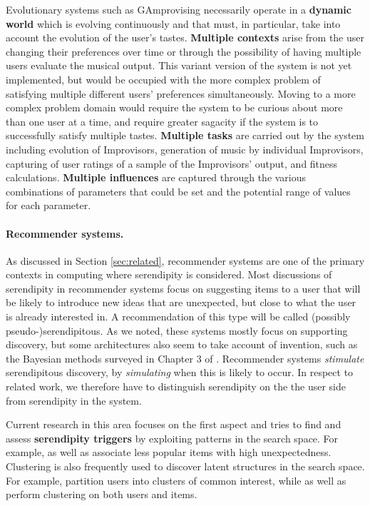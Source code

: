Evolutionary systems such as {\sf GAmprovising} necessarily operate in a \textbf{dynamic world} which is evolving continuously and that must, in particular, take into account the evolution of the user's tastes. \textbf{Multiple contexts} arise from  the user changing their preferences over time or through the possibility of having multiple users evaluate the musical output.  This variant version of the system is not yet implemented, but would be occupied with the more complex problem of satisfying multiple different users' preferences simultaneously.  Moving to a more complex problem domain would require the system to be curious about more than one user at a time, and require greater sagacity if the system is to successfully satisfy multiple tastes.  \textbf{Multiple tasks} are carried out by the system including evolution of Improvisors, generation of music by individual Improvisors, capturing of user ratings of a sample of the Improvisors' output, and fitness calculations.  \textbf{Multiple influences} are captured through the various combinations of parameters that could be set and the potential range of values for each parameter. 

\paragraph{Recommender systems.} 
As discussed in Section \ref{sec:related}, recommender systems are one
of the primary contexts in computing where serendipity is considered. Most discussions of serendipity in recommender systems focus on suggesting items to a user that will be likely to introduce new ideas that are unexpected, but close to what the user is already interested in. A recommendation of this type will be called (possibly \mbox{pseudo-)serendipitous}. As we noted, these systems mostly focus on supporting discovery, but some architectures also seem to take account of invention, such as the Bayesian methods surveyed in Chapter 3 of . Recommender systems \emph{stimulate} serendipitous discovery, by \emph{simulating} when this is likely to occur. In respect to related work, we therefore have to distinguish serendipity on the the user side from serendipity in the system. 

Current research in this area focuses on the first aspect and tries to find and assess \textbf{serendipity triggers} by exploiting patterns in the search space. For example,  as well as  associate less popular items with high unexpectedness. Clustering is also frequently used to discover latent structures in the search space. For example,  partition users into clusters of common interest, while  as well as  perform clustering on both users and items. %

